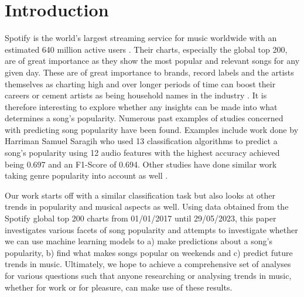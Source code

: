 \documentclass{article}
\begin{document}
\section{Introduction}
Spotify is the world's largest streaming service for music worldwide with an estimated 640 million active users \cite{spotifyCompanyInfo}.
Their charts, especially the global top 200, are of great importance as they show the most popular and relevant songs for any given day. These are of great importance to brands, record labels and the artists themselves as charting high and over longer periods of time can boost their careers or cement artists as being household names in the industry \cite{ariSpotifyCharts}. 
It is therefore interesting to explore whether any insights can be made into what determines a song’s popularity.
Numerous past examples of studies concerned with predicting song popularity have been found. Examples include work done by Harriman Samuel Saragih \cite{Indonesian-streaming} who used 13 classification algorithms to predict a song’s popularity using 12 audio features with the highest accuracy achieved being 0.697 and an F1-Score of 0.694. Other studies have done similar work taking genre popularity into account as well \cite{utwente}. 

Our work starts off with a similar classification task but also looks at other trends in popularity and musical aspects as well. Using data obtained from the Spotify global top 200 charts from 01/01/2017 until 29/05/2023, this paper investigates various facets of song popularity and attempts to investigate whether we can use machine learning models to a) make predictions about a song’s popularity, b) find what makes songs popular on weekends and c) predict future trends in music. Ultimately, we hope to achieve a comprehensive set of analyses for various questions such that anyone researching or analysing trends in music, whether for work or for pleasure, can make use of these results.




\end{document}
